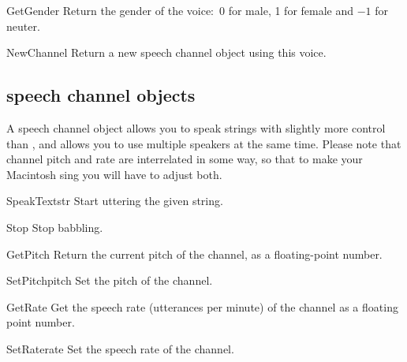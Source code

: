 \renewcommand{\indexsubitem}{(voice object method)}

\begin{funcdesc}{GetGender}{}
Return the gender of the voice:\ 0 for male, 1 for female and $-1$ for neuter.
\end{funcdesc}

\begin{funcdesc}{NewChannel}{}
Return a new speech channel object using this voice.
\end{funcdesc}

\subsection{speech channel objects}
A speech channel object allows you to speak strings with slightly more
control than , and allows you to use multiple
speakers at the same time. Please note that channel pitch and rate are
interrelated in some way, so that to make your Macintosh sing you will
have to adjust both.

\renewcommand{\indexsubitem}{(speech channel object method)}
\begin{funcdesc}{SpeakText}{str}
Start uttering the given string.
\end{funcdesc}

\begin{funcdesc}{Stop}{}
Stop babbling.
\end{funcdesc}

\begin{funcdesc}{GetPitch}{}
Return the current pitch of the channel, as a floating-point number.
\end{funcdesc}

\begin{funcdesc}{SetPitch}{pitch}
Set the pitch of the channel.
\end{funcdesc}

\begin{funcdesc}{GetRate}{}
Get the speech rate (utterances per minute) of the channel as a
floating point number.
\end{funcdesc}

\begin{funcdesc}{SetRate}{rate}
Set the speech rate of the channel.
\end{funcdesc}

